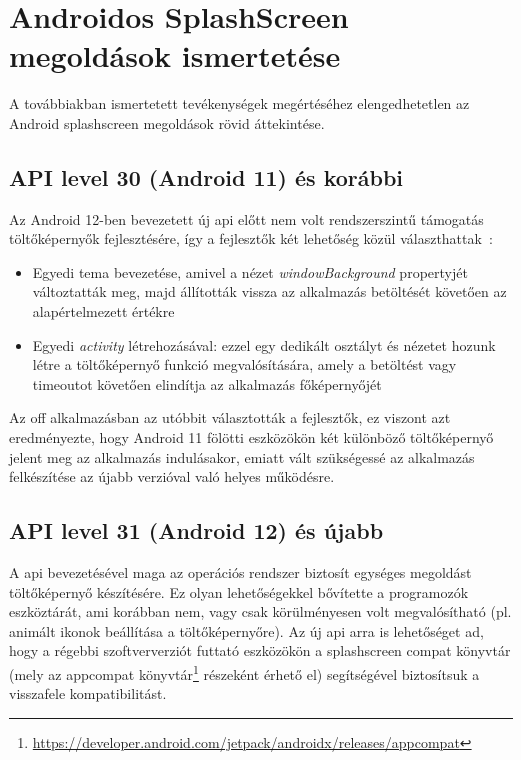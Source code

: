 \chapter{Androidos SplashScreen megoldások ismertetése}

A továbbiakban ismertetett tevékenységek megértéséhez elengedhetetlen
az Android \gls{splashscreen} megoldások rövid áttekintése.

\section{API level 30 (Android 11) és korábbi}
Az Android 12-ben bevezetett új \acrshort{api} előtt nem volt rendszerszintű támogatás töltőképernyők
fejlesztésére, így a fejlesztők két lehetőség közül választhattak~\cite{splashscreenmigration}:
\begin{itemize}
 \item Egyedi \gls{tema} bevezetése, amivel a nézet \textit{windowBackground} propertyjét változtatták meg,
 majd állították vissza az alkalmazás betöltését követően az alapértelmezett értékre
 \item Egyedi \textit{\Gls{activity}} létrehozásával: ezzel egy dedikált osztályt és nézetet hozunk létre
 a töltőképernyő funkció megvalósítására, amely a betöltést vagy timeoutot követően elindítja
 az alkalmazás főképernyőjét %
\end{itemize}


Az \acrlong{off} alkalmazásban az utóbbit választották a fejlesztők, ez viszont azt eredményezte,
hogy Android 11 fölötti eszközökön két különböző töltőképernyő jelent meg az alkalmazás indulásakor,
emiatt vált szükségessé az alkalmazás felkészítése az újabb verzióval való helyes működésre.

\section{API level 31 (Android 12) és újabb}
A  \acrshort{api} bevezetésével maga az operációs rendszer biztosít egységes megoldást
töltőképernyő készítésére. Ez olyan lehetőségekkel bővítette a programozók eszköztárát, ami korábban
nem, vagy csak körülményesen volt megvalósítható (pl. animált ikonok beállítása
a töltőképernyőre).
Az új \acrshort{api} arra is lehetőséget ad, hogy a régebbi szoftververziót futtató eszközökön a \gls{splashscreen}
compat könyvtár (mely az \gls{appcompat} könyvtár\footnote{\url{https://developer.android.com/jetpack/androidx/releases/appcompat}} részeként érhető el)
segítségével biztosítsuk a visszafele kompatibilitást.
